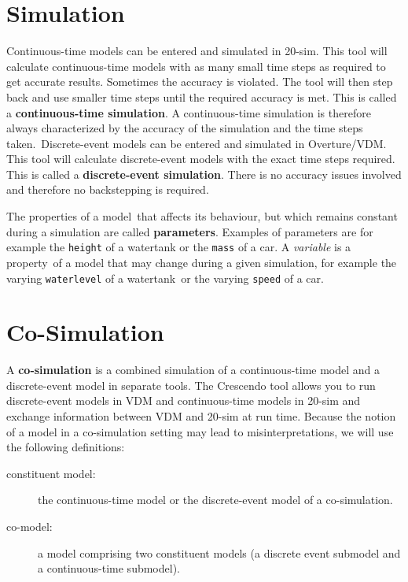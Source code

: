 \documentclass{crescendorepchap}
\begin{document}
\section{Simulation}

Continuous-time models can be entered and simulated in 20-sim. This tool
will calculate continuous-time models with as many small time steps as
required to get accurate results. Sometimes the accuracy is violated. The
tool will then step back and use smaller time steps until the required
accuracy is met. This is called a \textbf{continuous-time simulation}. A
continuous-time simulation is therefore always characterized by the
accuracy of the simulation and the time steps taken.~Discrete-event
models can be entered and simulated in Overture/VDM. This tool will calculate
discrete-event models with the exact time steps required. This is
called a \textbf{discrete-event simulation}. There is no accuracy issues
involved and therefore no backstepping is required.

The properties of a model~that affects its behaviour, but which remains
constant during a simulation are called \textbf{parameters}. Examples of
parameters are for example the \texttt{height} of a watertank or the \texttt{mass} of a car. A \emph{variable} is a property~of a model that may change during a given simulation, for example the varying \texttt{waterlevel} of a watertank~or the
varying \texttt{speed} of a car.

\section{Co-Simulation}

A \textbf{co-simulation} is a combined simulation of a continuous-time
model and a discrete-event model in separate tools. The Crescendo tool
allows you to run discrete-event models in VDM and continuous-time
models in 20-sim and exchange information between VDM and 20-sim at
run time. Because the notion of a model in a co-simulation setting may lead
to misinterpretations, we will use the following definitions:

\begin{description}
\item[constituent model:] the continuous-time model or the
  discrete-event model of a co-simulation.
\item[co-model:] a model comprising two constituent models (a
  discrete event submodel and a continuous-time submodel).
\end{description}
\end{document}
